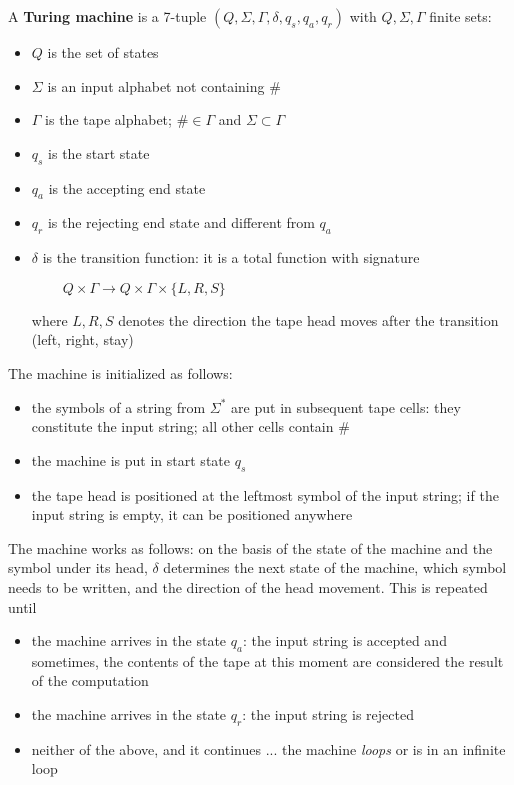 \begin{definition}
A {\bf Turing machine} is a 7-tuple
%
$(Q, \Sigma, \Gamma, \delta, q_s, q_a, q_r)$
%
with $Q, \Sigma, \Gamma$ finite sets:

\begin{itemize}
\item
$Q$ is the set of states

\item
$\Sigma$ is an input alphabet not containing \#

\item
$\Gamma$ is the tape alphabet; $\# \in \Gamma$ and $\Sigma \subset \Gamma$

\item
$q_s$ is the start state

\item
$q_a$ is the accepting end state


\item
$q_r$ is the rejecting end state and different from $q_a$


\item
$\delta$ is the transition function: it is a total function with
  signature

$~~~~~~~~~~Q \times \Gamma \rightarrow Q \times \Gamma \times \{L,R,S\}$

where $L, R, S$ denotes the direction the tape head moves after the transition (left, right, stay)

\end{itemize}
\end{definition}

The machine is initialized as follows:
\begin{itemize}
\item the symbols of a string from $\Sigma^*$ are put in subsequent
tape cells: they constitute the input string; all other cells contain
\#
\item the machine is put in start state $q_s$
\item the tape head is positioned at the leftmost symbol of the input
  string; if the input string is empty, it can be positioned anywhere
\end{itemize}

The machine works as follows: on the basis of the state of the
machine and the symbol under its head, $\delta$ determines the next
state of the machine, which symbol needs to be written, and the
direction of the head movement. This is repeated until
\begin{itemize}
\item the machine arrives in the state $q_a$: the input string is
  accepted and sometimes, the contents of the tape at this moment are
  considered the result of the computation
\item the machine arrives in the state $q_r$: the input string is
 rejected
\item neither of the above, and it continues ... the machine {\em
  loops} or is in an infinite loop
\end{itemize}


